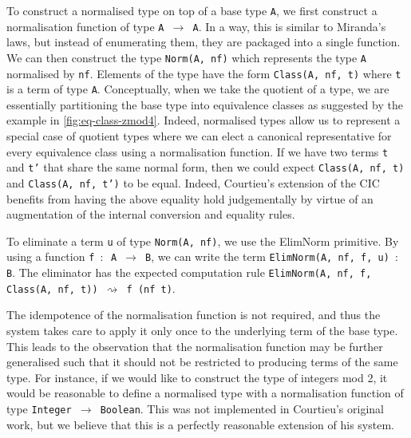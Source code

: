 \documentclass[12pt,twoside,maitrise]{dms}
\theoremstyle{definition}
\numberwithin{equation}{section}
\numberwithin{table}{chapter}
\numberwithin{figure}{chapter}
\newcommand\kw[1] {\textsf{#1}}
\newcommand\id[1] {\texttt{#1}}
\newcommand\fn[1] {\texttt{#1}}
\begin{document}
To construct a normalised type on top of a base type \id{A}, we first construct
a normalisation function of type \fn{A $\rightarrow$ A}. In a way, this is
similar to Miranda's laws, but instead of enumerating them, they are packaged
into a single function. We can then construct the type \fn{\kw{Norm}(A, nf)}
which represents the type \id{A} normalised by \id{nf}. Elements of the type
have the form \fn{\kw{Class}(A, nf, t)} where \id{t} is a term of type \id{A}.
Conceptually, when we take the quotient of a type, we are essentially
partitioning the base type into equivalence classes as suggested by the example
in \autoref{fig:eq-class-zmod4}. Indeed, normalised types allow us to represent
a special case of quotient types where we can elect a canonical representative
for every equivalence class using a normalisation function. If we have two terms
\id{t} and \id{t'} that share the same normal form, then we could expect
\fn{\kw{Class}(A, nf, t)} and \fn{\kw{Class}(A, nf, t')} to be equal. Indeed,
Courtieu's extension of the CIC benefits from having the above equality hold
judgementally by virtue of an augmentation of the internal conversion and
equality rules.

To eliminate a term \id{u} of type \fn{\kw{Norm}(A, nf)}, we use the
\kw{ElimNorm} primitive. By using a function \fn{f $\colon$ A $\rightarrow$ B},
we can write the term \fn{\kw{ElimNorm}(A, nf, f, u) $\colon$ B}. The eliminator
has the expected computation rule \fn{\kw{ElimNorm}(A, nf, f, \kw{Class}(A, nf,
  t)) $\rightsquigarrow{}$ f (nf t)}.

The idempotence of the normalisation function is not required, and thus the
system takes care to apply it only once to the underlying term of the base type.
This leads to the observation that the normalisation function may be further
generalised such that it should not be restricted to producing terms of the same
type. For instance, if we would like to construct the type of integers mod 2, it
would be reasonable to define a normalised type with a normalisation function of
type \fn{Integer $\rightarrow$ Boolean}. This was not implemented in Courtieu's
original work, but we believe that this is a perfectly reasonable extension of
his system.
\end{document}
